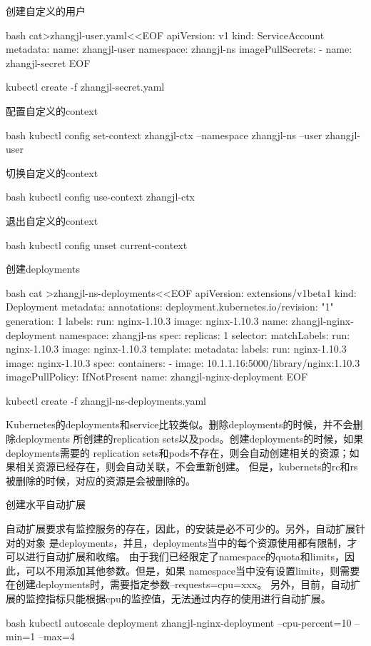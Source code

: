 \begin{outline}[enumerate]
\1 创建自定义的用户
\begin{code-in-enumerate}{bash}
cat>zhangjl-user.yaml<<EOF
apiVersion: v1
kind: ServiceAccount
metadata:
  name: zhangjl-user
  namespace: zhangjl-ns
imagePullSecrets:
- name: zhangjl-secret
EOF

kubectl create -f zhangjl-secret.yaml
\end{code-in-enumerate}

\1 配置自定义的context
\begin{code-in-enumerate}{bash}
kubectl config set-context zhangjl-ctx --namespace zhangjl-ns --user zhangjl-user
\end{code-in-enumerate}

\1 切换自定义的context
\begin{code-in-enumerate}{bash}
kubectl config use-context zhangjl-ctx
\end{code-in-enumerate}

\1 退出自定义的context
\begin{code-in-enumerate}{bash}
kubectl config unset current-context
\end{code-in-enumerate}

\1 创建deployments
\begin{code-in-enumerate}{bash}
cat >zhangjl-ns-deployments<<EOF
apiVersion: extensions/v1beta1
kind: Deployment
metadata:
  annotations:
    deployment.kubernetes.io/revision: "1"
  generation: 1
  labels:
    run: nginx-1.10.3
    image: nginx-1.10.3
  name: zhangjl-nginx-deployment
  namespace: zhangjl-ns
spec:
  replicas: 1
  selector:
    matchLabels:
      run: nginx-1.10.3
      image: nginx-1.10.3
  template:
    metadata:
      labels:
        run: nginx-1.10.3
        image: nginx-1.10.3
    spec:
      containers:
      - image: 10.1.1.16:5000/library/nginx:1.10.3
        imagePullPolicy: IfNotPresent
        name: zhangjl-nginx-deployment
EOF

kubectl create -f zhangjl-ns-deployments.yaml
\end{code-in-enumerate}
Kubernetes的deployments和service比较类似。删除deployments的时候，并不会删除deployments
所创建的replication sets以及pods。创建deployments的时候，如果deployments需要的
replication sets和pods不存在，则会自动创建相关的资源；如果相关资源已经存在，则会自动关联，不会重新创建。
但是，kubernets的rc和rs被删除的时候，对应的资源是会被删除的。

\1 创建水平自动扩展

自动扩展要求有监控服务的存在，因此，的安装是必不可少的。另外，自动扩展针对的对象
是deployments，并且，deployments当中的每个资源使用都有限制，才可以进行自动扩展和收缩。
由于我们已经限定了namespace的quota和limits，因此，可以不用添加其他参数。但是，如果
namespace当中没有设置limits，则需要在创建deployments时，需要指定参数--requests=cpu=xxx。
另外，目前，自动扩展的监控指标只能根据cpu的监控值，无法通过内存的使用进行自动扩展。
\begin{code-in-enumerate}{bash}
kubectl autoscale deployment zhangjl-nginx-deployment --cpu-percent=10 --min=1 --max=4


\end{code-in-enumerate}
\end{outline}
